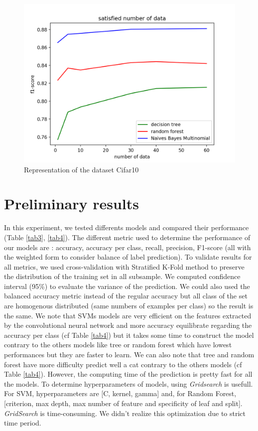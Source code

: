 \documentclass[10pt, a4paper, twocolumn]{article} %
\begin{document}
\begin{figure}[H]
	\includegraphics[width=\linewidth]{GraphOfScoreClassif3WithValidation.png} %
	\caption{\label{fig:size}Representation of the dataset Cifar10}
\end{figure}
\section{Preliminary results}
In this experiment, we tested differents models and compared their performance (Table \ref{tab3}, \ref{tab4}). The different metric used to determine the performance of our models are : accuracy, accuracy per class, recall, precision, F1-score (all with the weighted form to consider balance of label prediction). To validate results for all metrics, we used cross-validation with Stratified K-Fold method to preserve the distribution of the training set in all subsample. We computed confidence interval (95\%) to evaluate the variance of the prediction. We could also used the balanced accuracy metric instead of the regular accuracy but all class of the set are homogenous distributed (same numbers of examples per class) so the result is the same. We note that SVMs models are very efficient on the features extracted by the convolutional neural network and more accuracy equilibrate regarding the accuracy per class (cf Table \ref{tab4}) but it takes some time to construct the model contrary to the others models like tree or random forest which have lowest performances but they are faster to learn. We can also note that tree and random forest have more difficulty predict well a cat contrary to the others models (cf Table \ref{tab4}). However, the computing time of the prediction is pretty fast for all the models. To determine hyperparameters of models, using \textit{Gridsearch} is usefull. For SVM, hyperparameters are [C, kernel, gamma] and, for Random Forest, [criterion, max depth, max number of feature and specificity of leaf and split]. \textit{GridSearch} is time-consuming. We didn't realize this optimization due to strict time period.
\end{document}
